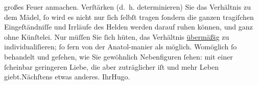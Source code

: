 \begin{ledgroupsized}[t]{13cm}
                    großes Feuer anmachen. {\pb}Verſtärken \introOben{}(d. h. determinieren)\introOben{}
               Sie das Verhältnis
                    zu dem Mädel, ſo wird es nicht nur ſich ſelbſt tragen ſondern die ganzen
                    tragiſchen Eingeſtändniſſe und Irrläufe des Helden werden darauf ruhen können,
                    und ganz ohne Künſtelei. Nur müſſen Sie ſich hüten, das Verhältnis \uline{übermäßig} zu individualiſieren; ſo fern von der
                        Anatol-manier als möglich.\pend
           \pstart
           Womöglich ſo behandelt und geſehen, wie Sie gewöhnlich Nebenfiguren ſehen: mit
                    einer ſcheinbar geringeren Liebe, die aber zuträglicher iſt und mehr Leben
                        giebt.\hspace*{2.5em}Nächſtens etwas anderes.\pend
           \pstart Ihr\spacefill\mbox{Hugo.}\pend{}
         
         \endnumbering{}\end{ledgroupsized}  \newcommand{\dateiname}{L00564}\newcommand{\titel}{Hugo von Hofmannsthal an Arthur Schnitzler, 16. 7. [1896]}\newcommand{\editorInnen}{Martin Anton Müller und Gerd-Hermann Susen}
      